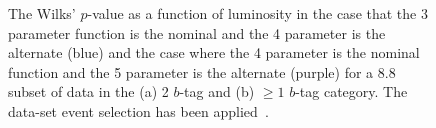 \begin{figure}[!htb]
  \begin{center}
    \captionsetup[subfigure]{aboveskip=0pt,justification=centering}
  \end{center} 
  \caption[The Wilks' \mbox{$p$-value} as a function of luminosity for a 8.8~\ifb{} subset of \summer{}
     data-set in the (a) 2 $b$-tag and (b) $\geq1$ $b$-tag category.]
          {The Wilks' \mbox{$p$-value} as a function of luminosity
            in the case that the 3 parameter function is the nominal and the 4 parameter is the alternate (blue)
            and the case where the 4 parameter is the nominal function and the 5 parameter is the alternate (purple)
            for a 8.8~\ifb{} subset of data in the (a) 2 $b$-tag and (b) $\geq1$ $b$-tag category.
            The \summer{} data-set event selection has been applied~\cite{dibjet-ichep_conf}.
  }
  \label{fig:bkg-summer-wilks}
\end{figure}


